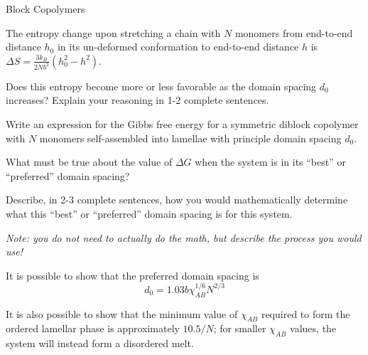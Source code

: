 \begin{activity}[extension]{Block Copolymers}
\begin{ctqs}
		\begin{solution}[1.5in]
		\end{solution}
		
	\question The entropy change upon stretching a chain with $N$ monomers from end-to-end distance $h_0$ in its un-deformed conformation to end-to-end distance $h$ is $\Delta S = \frac{3k_B}{2Nb^2}(h_0^2 - h^2)$.
	
		Does this entropy become more or less favorable as the domain spacing $d_0$ increases?  Explain your reasoning in 1-2 complete sentences.
	
		\begin{solution}[1.5in]
		\end{solution}
		
	\question Write an expression for the Gibbs free energy for a symmetric diblock copolymer with $N$ monomers self-assembled into lamellae with principle domain spacing $d_0$.
	
		\begin{solution}[1in]
		\end{solution}
	
	\question What must be true about the value of $\Delta G$ when the system is in its ``best'' or ``preferred'' domain spacing?
	
		\begin{solution}[1in]
		\end{solution}
	
	\question Describe, in 2-3 complete sentences, how you would mathematically determine what this ``best'' or ``preferred'' domain spacing is for this system.
	
		\emph{Note: you do not need to actually do the math, but describe the process you would use!}
	
		\begin{solution}[1in]
		\end{solution}
		
\end{ctqs}

\begin{infobox}

	It is possible to show that the preferred domain spacing is
		\begin{equation*}
			d_0 = 1.03 b \chi_{AB}^{1/6} N^{2/3}
		\end{equation*}
		
	It is also possible to show that the minimum value of $\chi_{AB}$ required to form the ordered lamellar phase is approximately $10.5/N$; for smaller $\chi_{AB}$ values, the system will instead form a disordered melt.


\end{infobox}
\end{activity}
